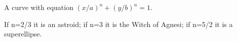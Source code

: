 A curve with equation $(x/a)^{n}+(y/b)^{n}=1.$ 
\par
If n=2/3 it is an astroid; if n=3 it is the Witch of Agnesi; if
n=5/2 it is a superellipse.
